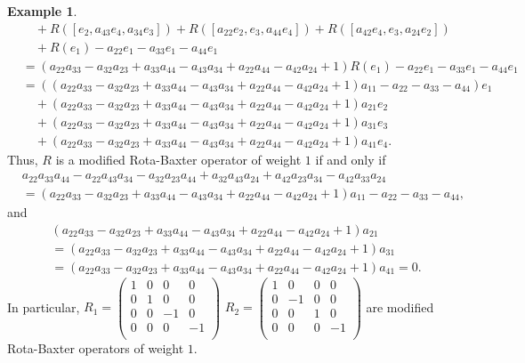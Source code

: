 \documentclass[12pt]{amsart}
\theoremstyle{definition}
\newtheorem{exam}[theorem]{Example}
\begin{document}
\begin{exam}
\begin{align*}
&\quad+R([e_2, a_{43}e_4, a_{34}e_3]) +R([a_{22}e_2, e_3, a_{44}e_4])+R([a_{42}e_4, e_3, a_{24}e_2])\\
&\quad +R(e_1)-a_{22}e_1-a_{33}e_1-a_{44}e_1\\
&=(a_{22}a_{33}-a_{32}a_{23}+a_{33}a_{44}-a_{43}a_{34}+a_{22}a_{44}-a_{42}a_{24}+1)R(e_1)-a_{22}e_1-a_{33}e_1-a_{44}e_1\\
&=((a_{22}a_{33}-a_{32}a_{23}+a_{33}a_{44}-a_{43}a_{34}+a_{22}a_{44}-a_{42}a_{24}+1)a_{11}-a_{22}-a_{33}-a_{44})e_1\\
&\quad +(a_{22}a_{33}-a_{32}a_{23}+a_{33}a_{44}-a_{43}a_{34}+a_{22}a_{44}-a_{42}a_{24}+1)a_{21}e_2\\
&\quad+ (a_{22}a_{33}-a_{32}a_{23}+a_{33}a_{44}-a_{43}a_{34}+a_{22}a_{44}-a_{42}a_{24}+1)a_{31}e_3\\
&\quad+ (a_{22}a_{33}-a_{32}a_{23}+a_{33}a_{44}-a_{43}a_{34}+a_{22}a_{44}-a_{42}a_{24}+1)a_{41}e_4.
\end{align*}
Thus, $R$ is a modified Rota-Baxter operator of weight $1$ if and only if
\begin{align*}
&a_{22}a_{33}a_{44}-a_{22}a_{43}a_{34}-a_{32}a_{23}a_{44}+a_{32}a_{43}a_{24}+a_{42}a_{23}a_{34}-a_{42}a_{33}a_{24}\\
&=(a_{22}a_{33}-a_{32}a_{23}+a_{33}a_{44}-a_{43}a_{34}+a_{22}a_{44}-a_{42}a_{24}+1)a_{11}-a_{22}-a_{33}-a_{44},
\end{align*}
and
\begin{align*}
&(a_{22}a_{33}-a_{32}a_{23}+a_{33}a_{44}-a_{43}a_{34}+a_{22}a_{44}-a_{42}a_{24}+1)a_{21}\\
&=(a_{22}a_{33}-a_{32}a_{23}+a_{33}a_{44}-a_{43}a_{34}+a_{22}a_{44}-a_{42}a_{24}+1)a_{31}\\
&=(a_{22}a_{33}-a_{32}a_{23}+a_{33}a_{44}-a_{43}a_{34}+a_{22}a_{44}-a_{42}a_{24}+1)a_{41}=0.
\end{align*}
In particular, $R_1=\left(
                                            \begin{array}{cccc}
                                             1  & 0 & 0 & 0\\
                                             0& 1& 0& 0\\
                                             0& 0& -1 & 0\\
                                               0& 0& 0 & -1\\
                                            \end{array}
                                          \right)$    $R_2=\left(
                                            \begin{array}{cccc}
                                             1  & 0 & 0 & 0\\
                                             0& -1& 0& 0\\
                                             0& 0& 1 & 0\\
                                               0& 0& 0 & -1\\
                                            \end{array}
                                          \right)$ are modified Rota-Baxter operators of weight $1$.


\end{exam}
\end{document}

